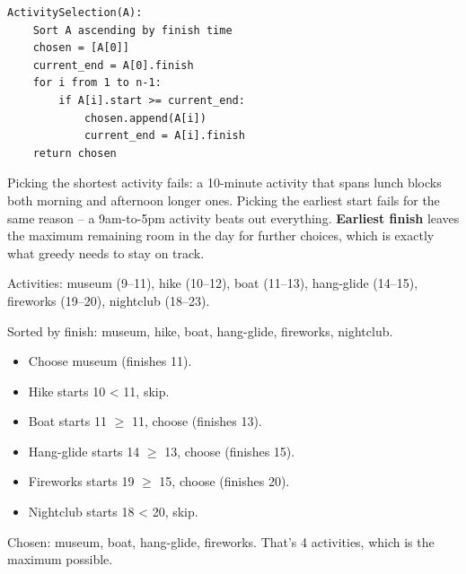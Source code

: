\documentclass[11pt]{article}
\begin{document}
\begin{examplebox}
\begin{verbatim}
ActivitySelection(A):
    Sort A ascending by finish time
    chosen = [A[0]]
    current_end = A[0].finish
    for i from 1 to n-1:
        if A[i].start >= current_end:
            chosen.append(A[i])
            current_end = A[i].finish
    return chosen
\end{verbatim}
\end{examplebox}

\begin{notebox}
Picking the shortest activity fails: a 10-minute activity that spans
lunch blocks both morning and afternoon longer ones. Picking the
earliest start fails for the same reason -- a 9am-to-5pm activity
beats out everything. \textbf{Earliest finish} leaves the maximum
remaining room in the day for further choices, which is exactly what
greedy needs to stay on track.
\end{notebox}

\begin{examplebox}
Activities: museum (9--11), hike (10--12), boat (11--13), hang-glide
(14--15), fireworks (19--20), nightclub (18--23).

Sorted by finish: museum, hike, boat, hang-glide, fireworks,
nightclub.

\begin{itemize}[leftmargin=*,noitemsep]
    \item Choose museum (finishes 11).
    \item Hike starts 10 < 11, skip.
    \item Boat starts 11 $\ge$ 11, choose (finishes 13).
    \item Hang-glide starts 14 $\ge$ 13, choose (finishes 15).
    \item Fireworks starts 19 $\ge$ 15, choose (finishes 20).
    \item Nightclub starts 18 < 20, skip.
\end{itemize}
Chosen: museum, boat, hang-glide, fireworks. That's 4 activities,
which is the maximum possible.
\end{examplebox}
\end{document}
